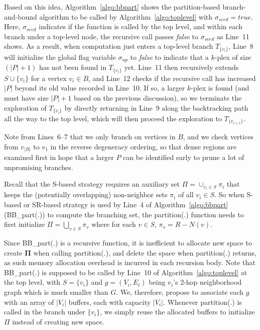 \documentclass[sigconf, nonacm]{acmart}
\begin{document}
Based on this idea, Algorithm~\ref{algo:bbpart} shows the partition-based branch-and-bound algorithm to be called by Algorithm~\ref{algo:toplevel} with $\sigma_{seed} = true$. Here, $\sigma_{seed}$ indicates if the function is called by the top level, and within each branch under a top-level node, the recursive call passes {\em false} to $\sigma_{seed}$ as Line~11 shows. As a result, when computation just enters a top-level branch $T_{\{v_i\}}$, Line~8 will initialize the global flag variable $\sigma_{up}$ to {\em false} to indicate that a $k$-plex of size $(|P|+1)$ has not been found in $T_{\{v_i\}}$ yet. Line~11 then recursively extends $S\cup \{v_i\}$ for a vertex $v_i\in B$, and Line~12 checks if the recursive call has increased $|P|$ beyond its old value recorded in Line~10. If so, a larger $k$-plex is found (and must have size $|P|+1$ based on the previous discussion), so we terminate the exploration of $T_{\{v_i\}}$ by directly returning in Line~9 along the backtracking path all the way to the top level, which will then proceed the exploration to $T_{\{v_{i+1}\}}$.

Note from Lines~6--7 that we only branch on vertices in $B$, and we check vertices from $v_{|B|}$ to $v_1$ in the reverse degeneracy ordering, so that dense regions are examined first in hope that a larger $P$ can be identified early to prune a lot of unpromising branches.

\vspace{1mm}
 Recall that the S-based strategy requires an auxiliary set $\Pi=\cup_{v_i\in S} \pi_i$ that keeps the (potentially overlapping) non-neighbor sets $\pi_i$ of all $v_i\in S$. So when S-based or SR-based strategy is used by Line~4 of Algorithm~\ref{algo:bbpart} (BB\_part(.)) to compute the branching set, the partition(.) function needs to first initialize $\Pi=\bigcup_{v\in S}\pi_v$ where for each $v\in S$, $\pi_v = R-N(v)$.

Since BB\_part(.) is a recursive function, it is inefficient to allocate new space to create $\mathbf{\Pi}$ when calling partition(.), and delete the space when partition(.) returns, as such memory allocation overhead is incurred in each recursion body. 
%
Note that BB\_part(.) is supposed to be called by Line~10 of Algorithm~\ref{algo:toplevel} at the top level, with $S=\{v_i\}$ and $g=(V_i, E_i)$ being $v_i$'s 2-hop neighborhood graph which is much smaller than $G$. We, therefore, propose to associate each $g$ with an array of $|V_i|$ buffers, each with capacity $|V_i|$. Whenever partition(.) is called in the branch under $\{v_i\}$, we simply reuse the allocated buffers to initialize $\Pi$ instead of creating new space.%
\end{document}
